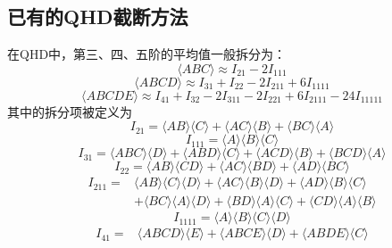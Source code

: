 \begin{subappendices}
\subsection{已有的QHD截断方法}
在QHD中，第三、四、五阶的平均值一般拆分为：
\begin{equation}
\langle A B C\rangle \approx I_{21}-2 I_{111}
\label{B1}
\end{equation}
\begin{equation}
	\langle A B C D\rangle \approx I_{31}+I_{22}-2 I_{211}+6 I_{1111}
	\label{B2}
\end{equation}
\begin{equation}
	\langle A B C D E\rangle \approx I_{41}+I_{32}-2 I_{311}-2 I_{221}+6 I_{2111}-24 I_{11111}
	\label{B3}
\end{equation}
其中的拆分项被定义为
\begin{equation}I_{21}=\langle A B\rangle\langle C\rangle+\langle A C\rangle\langle B\rangle+\langle B C\rangle\langle A\rangle\end{equation}
\begin{equation}I_{111}=\langle A\rangle\langle B\rangle\langle C\rangle\end{equation}
\begin{equation}I_{31}=\langle A B C\rangle\langle D\rangle+\langle A B D\rangle\langle C\rangle+\langle A C D\rangle\langle B\rangle+\langle B C D\rangle\langle A\rangle\end{equation}
\begin{equation}I_{22}=\langle A B\rangle\langle C D\rangle+\langle A C\rangle\langle B D\rangle+\langle A D\rangle\langle B C\rangle\end{equation}
\begin{equation}\begin{aligned}
I_{211}=&\langle A B\rangle\langle C\rangle\langle D\rangle+\langle A C\rangle\langle B\rangle\langle D\rangle+\langle A D\rangle\langle B\rangle\langle C\rangle \\
&+\langle B C\rangle\langle A\rangle\langle D\rangle+\langle B D\rangle\langle A\rangle\langle C\rangle+\langle C D\rangle\langle A\rangle\langle B\rangle
\end{aligned}\end{equation}
\begin{equation}I_{1111}=\langle A\rangle\langle B\rangle\langle C\rangle\langle D\rangle\end{equation}
\begin{equation}\begin{aligned}
I_{41}=&\langle A B C D\rangle\langle E\rangle+\langle A B C E\rangle\langle D\rangle+\langle A B D E\rangle\langle C\rangle \\

\end{aligned}
\end{equation}
\end{subappendices}
